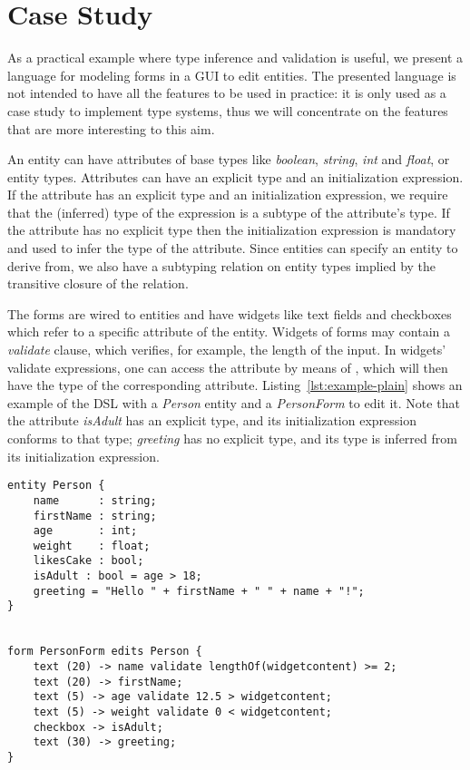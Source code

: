 \section{Case Study}
\label{sec:casestudy}

As a practical example where type inference and validation is useful, we present
a language for modeling forms in a GUI to edit entities.  The
presented language is not intended to have all the features to be used in
practice: it is only used as a case study to implement type systems, thus we
will concentrate on the features that are more interesting to this aim.

An entity can have attributes of base types like \emph{boolean}, \emph{string},
\emph{int} and \emph{float}, or entity types.
Attributes can have an explicit type and an initialization expression.
If the attribute has an explicit type and an initialization expression, we
require that the (inferred) type of the expression is a subtype of the
attribute's type. If the attribute has no explicit type then the initialization
expression is mandatory and used to infer the type of the attribute.
Since entities can specify an entity to derive from, we also have a subtyping
relation on entity types implied by the transitive closure of the
 relation.

The forms are wired to entities and have widgets like text fields and
checkboxes which refer to a specific attribute of the entity.
Widgets of forms may contain a \emph{validate} clause, which verifies, for
example, the length of the input.
In widgets' validate expressions, one can access the attribute by means of
, which will then have the type of the corresponding
attribute.  Listing~\ref{lst:example-plain} shows an example of the DSL with a
\emph{Person} entity and a \emph{PersonForm} to edit it. Note that the attribute
\emph{isAdult} has an explicit type, and its initialization expression
conforms to that type; \emph{greeting} has no explicit type, and its type is
inferred from its initialization expression.

%

\begin{lstlisting}[language=guidsl,float=*tb,multicols=2,label=lst:example-plain,caption=Forms
and Entities DSL.\ \ \ \ \ \ \ \ \ \ \ ] 
entity Person {
	name      : string;
	firstName : string;
	age       : int; 
	weight    : float;
	likesCake : bool; 
	isAdult : bool = age > 18;
	greeting = "Hello " + firstName + " " + name + "!";
}


form PersonForm edits Person {
	text (20) -> name validate lengthOf(widgetcontent) >= 2;
	text (20) -> firstName;
	text (5) -> age validate 12.5 > widgetcontent;
	text (5) -> weight validate 0 < widgetcontent;
	checkbox -> isAdult;
	text (30) -> greeting;
}
\end{lstlisting}


